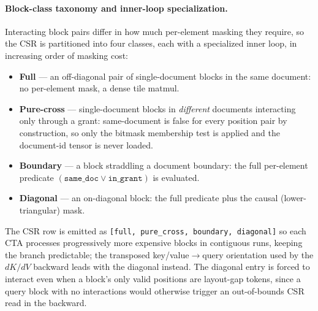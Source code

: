 \paragraph{Block-class taxonomy and inner-loop specialization.}
Interacting block pairs differ in how much per-element masking they require, so the CSR
is partitioned into four classes, each with a specialized inner loop, in increasing
order of masking cost:
\begin{itemize}
  \item \textbf{Full} --- an off-diagonal pair of single-document blocks in the same
  document: no per-element mask, a dense tile matmul.
  \item \textbf{Pure-cross} --- single-document blocks in \emph{different} documents
  interacting only through a grant: same-document is false for every position pair by
  construction, so only the bitmask membership test is applied and the document-id
  tensor is never loaded.
  \item \textbf{Boundary} --- a block straddling a document boundary: the full
  per-element predicate $(\texttt{same\_doc}\lor\texttt{in\_grant})$ is evaluated.
  \item \textbf{Diagonal} --- an on-diagonal block: the full predicate plus the causal
  (lower-triangular) mask.
\end{itemize}
The CSR row is emitted as \texttt{[full, pure\_cross, boundary, diagonal]} so each CTA
processes progressively more expensive blocks in contiguous runs, keeping the branch
predictable; the transposed key/value$\to$query orientation used by the $dK/dV$
backward leads with the diagonal instead. The diagonal entry is forced to interact
even when a block's only valid positions are layout-gap tokens, since a query block
with no interactions would otherwise trigger an out-of-bounds CSR read in the backward.

